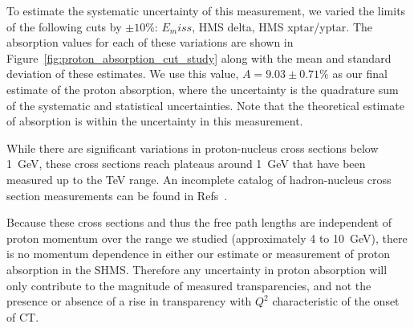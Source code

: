 To estimate the systematic uncertainty of this measurement, we varied the limits
of the following cuts by $\pm10\%$: $E_miss$, HMS delta, HMS xptar/yptar.
The absorption values for each of these variations are shown in
Figure~\ref{fig:proton_absorption_cut_study} along with the mean and standard
deviation of these estimates.
We use this value, $A=9.03\pm0.71\%$ as our final estimate of the proton
absorption, where the uncertainty is the quadrature sum of the systematic and
statistical uncertainties.
Note that the theoretical estimate of absorption is within the uncertainty in
this measurement.


While there are significant variations in proton-nucleus cross sections below
\SI{1}{\giga\electronvolt},
these cross sections reach plateaus around \SI{1}{\giga\electronvolt}
that have been measured up to the TeV range.
An incomplete catalog of hadron-nucleus cross section measurements can be found
in Refs~\cite{Carroll_1979, Kwong_1984, Denisov_1973, Ray_1979, Wellisch_1996,
Letaw_1983, Kohama_2016}.


Because these cross sections and thus the free path lengths are independent of
proton momentum over the range we studied (approximately 4 to
\SI{10}{\giga\electronvolt}), there is no momentum dependence in either our
estimate or measurement of proton absorption in the SHMS.
Therefore any uncertainty in proton absorption will only contribute to the
magnitude of measured transparencies, and not the presence or absence of a rise
in transparency with $Q^2$ characteristic of the onset of CT.

